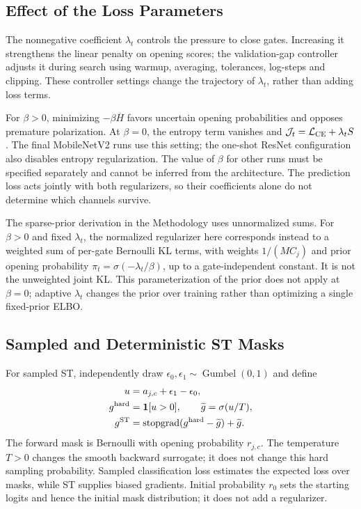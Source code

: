 \subsection{Effect of the Loss Parameters}

The nonnegative coefficient $\lambda_t$ controls the pressure to close
gates. Increasing it strengthens the linear penalty on opening scores;
the validation-gap controller adjusts it during search using warmup,
averaging, tolerances, log-steps and clipping. These controller settings
change the trajectory of $\lambda_t$, rather than adding loss terms.

For $\beta>0$, minimizing $-\beta\overline H$ favors uncertain opening
probabilities and opposes premature polarization. At $\beta=0$, the
entropy term vanishes and
$\mathcal J_t=\mathcal L_{\rm CE}+\lambda_t S$.
The final MobileNetV2 runs use this setting; the one-shot ResNet
configuration also disables entropy regularization. The value of
$\beta$ for other runs must be specified separately and cannot be
inferred from the architecture. The prediction loss acts jointly with
both regularizers, so their coefficients alone do not determine which
channels survive.

The sparse-prior derivation in the Methodology uses unnormalized sums.
For $\beta>0$ and fixed $\lambda_t$, the normalized regularizer here
corresponds instead to a weighted sum of per-gate Bernoulli KL terms,
with weights $1/(MC_j)$ and prior opening probability
$\pi_t=\sigma(-\lambda_t/\beta)$, up to a gate-independent constant.
It is not the unweighted joint KL. This parameterization of the prior
does not apply at $\beta=0$; adaptive $\lambda_t$ changes the prior over
training rather than optimizing a single fixed-prior ELBO.

\subsection{Sampled and Deterministic ST Masks}

For sampled ST, independently draw
$\epsilon_0,\epsilon_1\sim\operatorname{Gumbel}(0,1)$ and define
\begin{equation}
\begin{aligned}
u&=a_{j,c}+\epsilon_1-\epsilon_0,\\
g^{\rm hard}&=\mathbf1[u>0],\qquad \widetilde g=\sigma(u/T),\\
g^{\rm ST}&=\operatorname{stopgrad}(g^{\rm hard}-\widetilde g)+\widetilde g.
\end{aligned}
\end{equation}
The forward mask is Bernoulli with opening probability $r_{j,c}$.
The temperature $T>0$ changes the smooth backward surrogate; it does
not change this hard sampling probability. Sampled classification loss
estimates the expected loss over masks, while ST supplies biased
gradients. Initial probability $r_0$ sets the starting logits and hence
the initial mask distribution; it does not add a regularizer.

